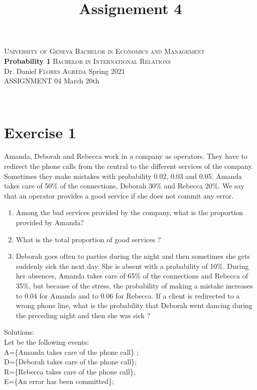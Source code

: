 \documentclass[12pt,thmsa]{article}\usepackage[]{graphicx}\usepackage[]{color}
\title{Assignement 4}
\begin{document}
\noindent \textsc{University of Geneva}     \hfill \textsc{Bachelor in Economics and Management} \\
\textbf{Probability 1}                      \hfill \textsc{Bachelor in International Relations} \\
Dr. Daniel \textsc{Flores Agreda}                 \hfill Spring 2021  \\
ASSIGNMENT 04                               \hfill   March 20th



\noindent
\makebox[\linewidth]{\rule{\textwidth}{0.4pt}}\\[1.5ex]

\section*{Exercise 1}

Amanda, Deborah and Rebecca work in a company as operators. They have to redirect the phone calls from the central to the different services of the company. Sometimes they make mistakes with
probability 0.02, 0.03 and 0.05. Amanda takes care of 50\% of the connections, Deborah 30\% and Rebecca 20\%. We say that an operator provides a good service if she does not commit any error.

\begin{enumerate}
  \item Among the bad services provided by the company, what is the proportion provided by Amanda?
  \item What is the total proportion of good services ?
  \item
  Deborah goes often to parties during the night and then sometimes she gets suddenly sick the next day. She is absent with a probability of 10\%.
  During her absences, Amanda takes care of 65\% of the connections and Rebecca of 35\%, but because of the stress, the probability of making a mistake
  increases to 0.04 for Amanda and to 0.06 for Rebecca. If a client is redirected to a wrong phone line, what is the probability that Deborah went dancing during the preceding night and then she was sick ?
\end{enumerate}

\noindent Solutions:\\
Let be the following events: \\
A=\{Amanda takes care of the phone call\} ; \\
D=\{Deborah takes care of the phone call\}; \\
R=\{Rebecca takes care of the phone call\}; \\
E=\{An error has been committed\}; \\
\end{document}
